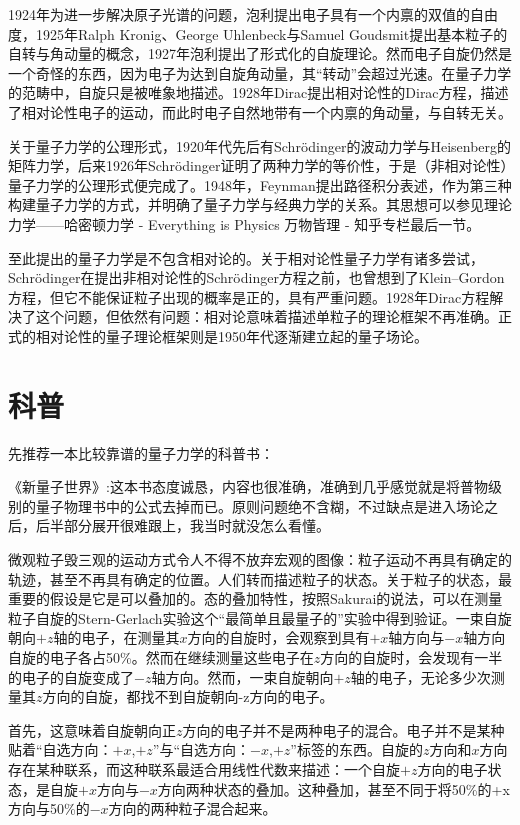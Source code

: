 \documentclass{ctexart}
\begin{document}
1924年为进一步解决原子光谱的问题，泡利提出电子具有一个内禀的双值的自由度，1925年Ralph Kronig、George Uhlenbeck与Samuel Goudsmit提出基本粒子的自转与角动量的概念，1927年泡利提出了形式化的自旋理论。然而电子自旋仍然是一个奇怪的东西，因为电子为达到自旋角动量，其“转动”会超过光速。在量子力学的范畴中，自旋只是被唯象地描述。1928年Dirac提出相对论性的Dirac方程，描述了相对论性电子的运动，而此时电子自然地带有一个内禀的角动量，与自转无关。

关于量子力学的公理形式，1920年代先后有Schrödinger的波动力学与Heisenberg的矩阵力学，后来1926年Schrödinger证明了两种力学的等价性，于是（非相对论性）量子力学的公理形式便完成了。1948年，Feynman提出路径积分表述，作为第三种构建量子力学的方式，并明确了量子力学与经典力学的关系。其思想可以参见理论力学——哈密顿力学 - Everything is Physics 万物皆理 - 知乎专栏最后一节。

至此提出的量子力学是不包含相对论的。关于相对论性量子力学有诸多尝试，Schrödinger在提出非相对论性的Schrödinger方程之前，也曾想到了Klein–Gordon方程，但它不能保证粒子出现的概率是正的，具有严重问题。1928年Dirac方程解决了这个问题，但依然有问题：相对论意味着描述单粒子的理论框架不再准确。正式的相对论性的量子理论框架则是1950年代逐渐建立起的量子场论。

\section{科普}
先推荐一本比较靠谱的量子力学的科普书：

《新量子世界》:这本书态度诚恳，内容也很准确，准确到几乎感觉就是将普物级别的量子物理书中的公式去掉而已。原则问题绝不含糊，不过缺点是进入场论之后，后半部分展开很难跟上，我当时就没怎么看懂。

微观粒子毁三观的运动方式令人不得不放弃宏观的图像：粒子运动不再具有确定的轨迹，甚至不再具有确定的位置。人们转而描述粒子的状态。关于粒子的状态，最重要的假设是它是可以叠加的。态的叠加特性，按照Sakurai的说法，可以在测量粒子自旋的Stern-Gerlach实验这个“最简单且最量子的”实验中得到验证。一束自旋朝向$+z$轴的电子，在测量其$x$方向的自旋时，会观察到具有$+x$轴方向与$-x$轴方向自旋的电子各占50\%。然而在继续测量这些电子在$z$方向的自旋时，会发现有一半的电子的自旋变成了$-z$轴方向。然而，一束自旋朝向$+z$轴的电子，无论多少次测量其$z$方向的自旋，都找不到自旋朝向-z方向的电子。

首先，这意味着自旋朝向正$z$方向的电子并不是两种电子的混合。电子并不是某种贴着“自选方向：$+x$,$+z$”与“自选方向：$-x$,$+z$”标签的东西。自旋的$z$方向和$x$方向存在某种联系，而这种联系最适合用线性代数来描述：一个自旋$+z$方向的电子状态，是自旋$+x$方向与$-x$方向两种状态的叠加。这种叠加，甚至不同于将50\%的+x方向与50\%的$-x$方向的两种粒子混合起来。
\end{document}
